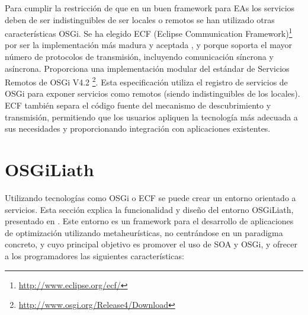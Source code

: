\documentclass[runningheads]{llncs}
\begin{document}
Para cumplir la restricción de que en un buen framework para EAs los servicios deben de ser indistinguibles de ser locales o remotos se han utilizado otras características OSGi.  Se ha elegido ECF (Eclipse Communication Framework)\footnote{\url{http://www.eclipse.org/ecf/}} por ser la implementación más madura y aceptada \cite{petzold2011dynamic}, y porque soporta el mayor número de protocolos de transmisión, incluyendo comunicación síncrona y asíncrona. Proporciona una implementación modular del estándar de Servicios Remotos de OSGi V4.2 \footnote{\url{http://www.osgi.org/Release4/Download}}. Esta especificación utiliza el registro de servicios de OSGi para exponer servicios como remotos (siendo indistinguibles de los locales). ECF también separa el código fuente del mecanismo de descubrimiento y transmisión, permitiendo que los usuarios apliquen la tecnología más adecuada a sus necesidades y proporcionando integración con aplicaciones existentes.


\section{OSGiLiath}
\label{sec:osgiliath}
Utilizando tecnologías como OSGi o ECF se puede crear un entorno orientado a servicios. Esta sección explica la funcionalidad y diseño del entorno OSGiLiath, presentado en \cite{OSGILIATH}. Este entorno es un framework para el desarrollo de aplicaciones de optimización utilizando metaheurísticas, no centrándose en un paradigma concreto, y cuyo principal objetivo es promover el uso de SOA y OSGi, y ofrecer a los programadores las siguientes características:
\end{document}
